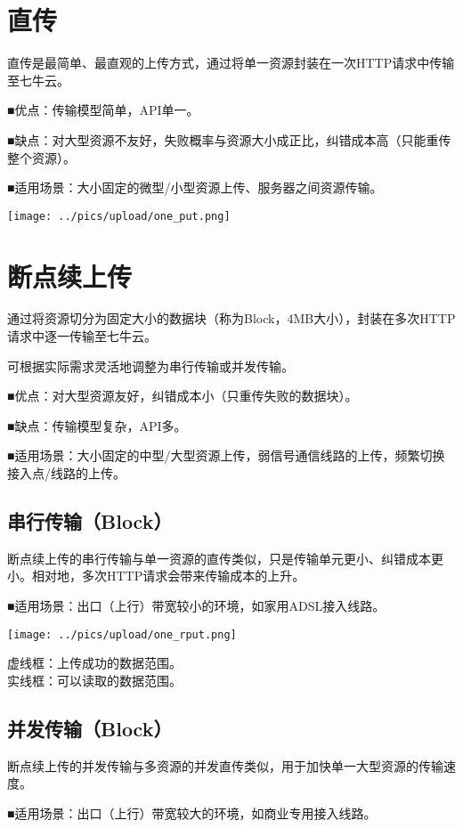 \documentclass[11pt, oneside]{book}
\newcommand{\qpara}[1]{
\vspace{0.3em}
\noindent
#1\par
\vspace{0.3em}
}
\begin{document}
\section{直传}

\qpara{直传是最简单、最直观的上传方式，通过将单一资源封装在一次HTTP请求中传输至七牛云。}
\qpara{■\thinspace 优点：传输模型简单，API单一。}
\qpara{■\thinspace 缺点：对大型资源不友好，失败概率与资源大小成正比，纠错成本高（只能重传整个资源）。}
\qpara{■\thinspace 适用场景：大小固定的微型/小型资源上传、服务器之间资源传输。}

\begin{center}
\texttt{[image: ../pics/upload/one\_put.png]}
\end{center}

\section{断点续上传}

\qpara{通过将资源切分为固定大小的数据块（称为Block，4MB大小），封装在多次HTTP请求中逐一传输至七牛云。}
\qpara{可根据实际需求灵活地调整为串行传输或并发传输。}
\qpara{■\thinspace 优点：对大型资源友好，纠错成本小（只重传失败的数据块）。}
\qpara{■\thinspace 缺点：传输模型复杂，API多。}
\qpara{■\thinspace 适用场景：大小固定的中型/大型资源上传，弱信号通信线路的上传，频繁切换接入点/线路的上传。}

\subsection{串行传输（Block）}

\qpara{断点续上传的串行传输与单一资源的直传类似，只是传输单元更小、纠错成本更小。相对地，多次HTTP请求会带来传输成本的上升。}
\qpara{■\thinspace 适用场景：出口（上行）带宽较小的环境，如家用ADSL接入线路。}

\begin{center}
\texttt{[image: ../pics/upload/one\_rput.png]}
\end{center}

\qpara{虚线框：上传成功的数据范围。 \\ 实线框：可以读取的数据范围。}

\subsection{并发传输（Block）}

\qpara{断点续上传的并发传输与多资源的并发直传类似，用于加快单一大型资源的传输速度。}
\qpara{■\thinspace 适用场景：出口（上行）带宽较大的环境，如商业专用接入线路。}
\end{document}

